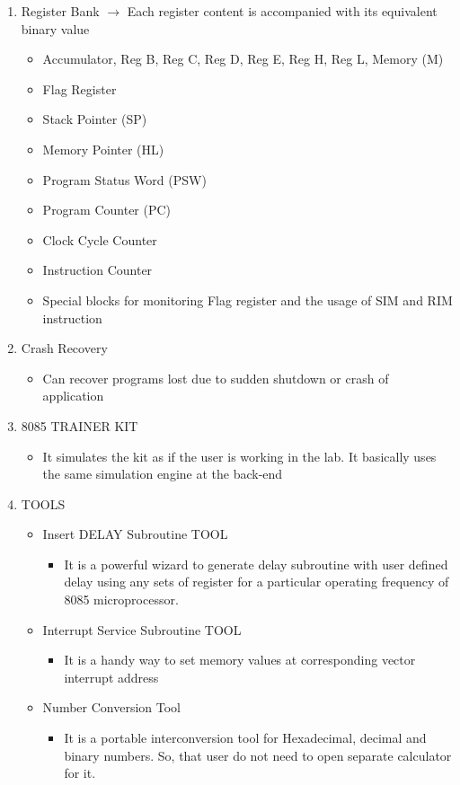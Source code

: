 \begin{enumerate}
\item Register Bank $ \longrightarrow $ Each register content is accompanied with its equivalent binary value
	\begin{itemize}
	\item Accumulator, Reg B, Reg C, Reg D, Reg E, Reg H, Reg L, Memory (M)
	\item Flag Register
	\item Stack Pointer (SP)
	\item Memory Pointer (HL)
	\item Program Status Word (PSW)
	\item Program Counter (PC)
	\item Clock Cycle Counter
	\item Instruction Counter
	\item Special blocks for monitoring Flag register  and the usage of SIM and RIM instruction	
	\end{itemize}

\item Crash Recovery
	\begin{itemize}
	\item Can recover programs lost due to sudden shutdown or crash of application
	\end{itemize} 

\item 8085 TRAINER KIT
	\begin{itemize}
	\item It simulates the kit as if the user is working in the lab. It basically uses the same simulation engine at the back-end
	\end{itemize}

\item TOOLS
	\begin{itemize}
	\item Insert DELAY Subroutine TOOL 
		\begin{itemize}
		\item It is a powerful wizard to generate delay subroutine with user defined delay using any sets of register for a particular operating frequency of 8085 microprocessor.
		\end{itemize}
	\item Interrupt Service Subroutine TOOL 
			\begin{itemize}
			\item It is a handy way to set memory values at corresponding vector interrupt address
			\end{itemize}
	\item Number Conversion Tool 
				\begin{itemize}
				\item It is a portable interconversion tool for Hexadecimal, decimal and binary numbers. So, that user do not need to open separate calculator for it.
				\end{itemize}
	\end{itemize}
	




\end{enumerate}
	